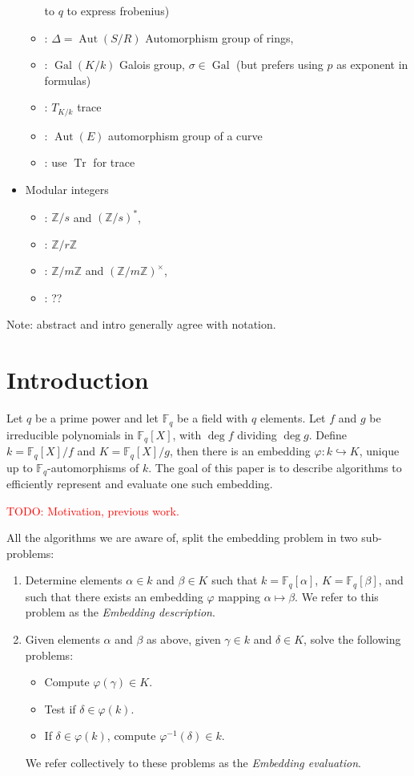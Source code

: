 \documentclass[12pt]{article}
\theoremstyle{plain}
\theoremstyle{definition}
\newcommand{\todo}[1]{\textcolor{red}{TODO: #1}}
\DeclareMathOperator{\trace}{Tr} %
\DeclareMathOperator{\gal}{Gal} %
\DeclareMathOperator{\Aut}{Aut}
\def\Z{\ensuremath{\mathbb{Z}}}
\def\F{\ensuremath{\mathbb{F}}}
\newcounter{algorithm}
\begin{document}
\begin{itemize}
\begin{itemize}
    to $q$ to express frobenius)
  \item \kummer: $\Delta=\Aut(S/R)$ Automorphism group of rings,
  \item \kummer: $\gal(K/k)$ Galois group, $\sigma\in\gal$ (but
    prefers using $p$ as exponent in formulas)
  \item \kummer: $T_{K/k}$ trace
  \item \rains: $\Aut(E)$ automorphism group of a curve
  \item \prop: use $\trace$ for trace
  \end{itemize}
\item Modular integers
  \begin{itemize}
  \item \poster: $\Z/s$ and $(\Z/s)^\ast$,
  \item \kummer: $\Z/r\Z$
  \item \rains: $\Z/m\Z$ and $(\Z/m\Z)^\times$,
  \item \prop: ??
  \end{itemize}
\end{itemize}

Note: abstract and intro generally agree with \poster{} notation.



\section{Introduction}

Let $q$ be a prime power and let $\F_q$ be a field with $q$
elements. Let $f$ and $g$ be irreducible polynomials in $\F_q[X]$,
with $\deg f$ dividing $\deg g$. Define $k=\F_q[X]/f$ and
$K=\F_q[X]/g$, then there is an embedding $\varphi:k\hookrightarrow
K$, unique up to $\F_q$-automorphisms of $k$. The goal of this paper
is to describe algorithms to efficiently represent and evaluate one
such embedding.

\todo{Motivation, previous work.}

All the algorithms we are aware of, split the embedding problem in two
sub-problems:
\begin{enumerate}
\item Determine elements $\alpha\in k$ and $\beta\in K$ such that
  $k=\F_q[\alpha]$, $K=\F_q[\beta]$, and such that there exists an
  embedding $\varphi$ mapping $\alpha\mapsto\beta$. We refer to this
  problem as the \emph{Embedding description}.
\item Given elements $\alpha$ and $\beta$ as above, given $\gamma\in
  k$ and $\delta\in K$, solve the following problems:
  \begin{itemize}
  \item Compute $\varphi(\gamma)\in K$.
  \item Test if $\delta\in\varphi(k)$.
  \item If $\delta\in\varphi(k)$, compute $\varphi^{-1}(\delta)\in k$.
  \end{itemize}
  We refer collectively to these problems as the \emph{Embedding
    evaluation}.
\end{enumerate}
\end{document}
